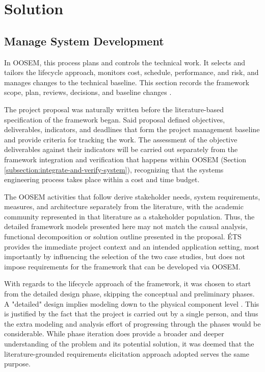 \documentclass[11pt,a4paper]{article}
\begin{document}
\section{Solution}

\subsection{Manage System Development}
In OOSEM, this process plans and controls the technical work. It selects and tailors the lifecycle approach, monitors cost, schedule, performance, and risk, and manages changes to the technical baseline. This section records the framework scope, plan, reviews, decisions, and baseline changes \cite{friedenthal2014practical}.

The project proposal was naturally written before the literature-based specification of the framework began. Said proposal defined objectives, deliverables, indicators, and deadlines that form the project management baseline and provide criteria for tracking the work.
The assessment of the objective deliverables against their indicators will be carried out separately from the framework integration and verification that happens within OOSEM (Section \ref{subsection:integrate-and-verify-system}),
recognizing that the systems engineering process takes place within a cost and time budget.

The OOSEM activities that follow derive stakeholder needs, system requirements, measures, and architecture separately from the literature, with the academic community represented in that literature as a stakeholder population. Thus, the detailed framework models presented here may not match the causal analysis, functional decomposition or solution outline presented in the proposal. ÉTS provides the immediate project context and an intended application setting, most importantly by influencing the selection of the two case studies, but does not impose requirements for the framework that can be developed via OOSEM.

With regards to the lifecycle approach of the framework, it was chosen to start from the detailed design phase, skipping the conceptual and preliminary phases.
A "detailed" design implies modeling down to the physical component level \cite{friedenthal2014practical}.
This is justified by the fact that the project is carried out by a single person, and thus the extra modeling and analysis effort of progressing through the phases would be considerable.
While phase iteration does provide a broader and deeper understanding of the problem and its potential solution, it was deemed that the literature-grounded requirements elicitation approach adopted serves the same purpose.
\end{document}

